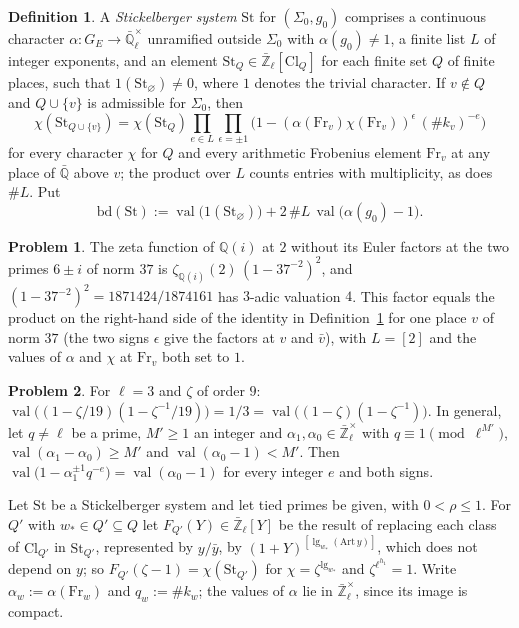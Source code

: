 \documentclass[reqno]{amsart}
\theoremstyle{definition}
\newtheorem{problem}{Problem}[section]
\newtheorem{definition}{Definition}[section]
\theoremstyle{plain}
\newcommand{\Q}{\mathbb{Q}}
\newcommand{\Ql}{\bar{\mathbb{Q}}_\ell}
\newcommand{\Zl}{\bar{\mathbb{Z}}_\ell}
\newcommand{\val}{\operatorname{val}}
\newcommand{\St}{\mathrm{St}}
\newcommand{\bd}{\mathrm{bd}}
\newcommand{\Fr}{\mathrm{Fr}}
\begin{document}
\begin{definition}\label{def:system}
A \emph{Stickelberger system} \(\St\) for \((\Sigma_0, g_0)\) comprises a continuous character \(\alpha\colon G_E \to \Ql^\times\) unramified outside \(\Sigma_0\) with \(\alpha(g_0) \ne 1\), a finite list \(L\) of integer exponents, and an element \(\St_Q \in \Zl[\mathrm{Cl}_Q]\) for each finite set \(Q\) of finite places, such that \(1(\St_\varnothing) \ne 0\), where \(1\) denotes the trivial character.  If \(v \notin Q\) and \(Q \cup \{v\}\) is admissible for \(\Sigma_0\), then
\[
  \chi(\St_{Q \cup \{v\}})
  = \chi(\St_Q) \prod_{e \in L} \prod_{\epsilon = \pm 1}
      \bigl(1 - (\alpha(\Fr_v)\chi(\Fr_v))^{\epsilon}\, (\# k_v)^{-e}\bigr)
\]
for every character \(\chi\) for \(Q\) and every arithmetic Frobenius element \(\Fr_v\) at any place of \(\bar{\Q}\) above \(v\); the product over \(L\) counts entries with multiplicity, as does \(\#L\).  Put
\[
  \bd(\St) := \val\bigl(1(\St_\varnothing)\bigr) + 2\,\# L\,\val\bigl(\alpha(g_0) - 1\bigr) .
\]
\end{definition}

\begin{problem}\label{pr:delete}
The zeta function of \(\Q(i)\) at \(2\) without its Euler factors at the two primes \(6 \pm i\) of norm \(37\) is \(\zeta_{\Q(i)}(2)\,(1 - 37^{-2})^2\), and \((1 - 37^{-2})^2 = 1871424/1874161\) has \(3\)-adic valuation \(4\).  This factor equals the product on the right-hand side of the identity in Definition~\ref{def:system} for one place \(v\) of norm \(37\) (the two signs \(\epsilon\) give the factors at \(v\) and \(\bar v\)), with \(L = [2]\) and the values of \(\alpha\) and \(\chi\) at \(\Fr_v\) both set to \(1\).
\end{problem}

\begin{problem}\label{pr:euler-line}
For \(\ell = 3\) and \(\zeta\) of order \(9\): \(\val\bigl((1 - \zeta/19)(1 - \zeta^{-1}/19)\bigr) = 1/3 = \val\bigl((1 - \zeta)(1 - \zeta^{-1})\bigr)\).  In general, let \(q \ne \ell\) be a prime, \(M' \ge 1\) an integer and \(\alpha_1, \alpha_0 \in \Zl^\times\) with \(q \equiv 1 \pmod{\ell^{M'}}\), \(\val(\alpha_1 - \alpha_0) \ge M'\) and \(\val(\alpha_0 - 1) < M'\).  Then \(\val\bigl(1 - \alpha_1^{\pm 1} q^{-e}\bigr) = \val(\alpha_0 - 1)\) for every integer \(e\) and both signs.
\end{problem}

Let \(\St\) be a Stickelberger system and let tied primes be given, with \(0 < \rho \le 1\).  For \(Q'\) with \(w_* \in Q' \subseteq Q\) let \(F_{Q'}(Y) \in \Zl[Y]\) be the result of replacing each class of \(\mathrm{Cl}_{Q'}\) in \(\St_{Q'}\), represented by \(y/\bar y\), by \((1 + Y)^{[\lg_{w_*}(\mathrm{Art}\,y)]}\), which does not depend on \(y\); so \(F_{Q'}(\zeta - 1) = \chi(\St_{Q'})\) for \(\chi = \zeta^{\lg_{w_*}}\) and \(\zeta^{\ell^{h_1}} = 1\).  Write \(\alpha_w := \alpha(\Fr_w)\) and \(q_w := \#k_w\); the values of \(\alpha\) lie in \(\Zl^\times\), since its image is compact.
\end{document}
